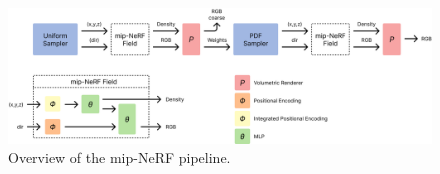 \begin{figure}[h]
    \centering
    \includegraphics[width=1.0\textwidth]{figures/mip-nerf-pipeline-overview.png}
    \caption{Overview of the mip-NeRF pipeline.}
    \label{fig:mip-nerf-pipeline-overview}
\end{figure}